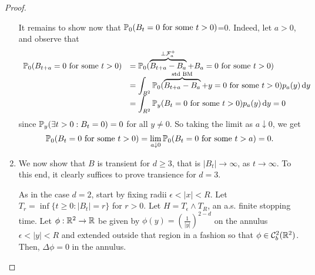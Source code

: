 \documentclass{article}
\begin{document}
\begin{proof}
\begin{enumerate}
 It remains to show now that $ \mathbb{P}_{0}(B_{t}=0 \text{ for some }t>0)$=0. Indeed, let $ a>0$, and observe that 
\[
\begin{array}{ll}
	\mathbb{P}_{0}(B_{t+a}=0 \text{ for some }t>0) &= \mathbb{P}_{0}(\overbrace{B_{t+a}-B_{a}}^{\perp \mathcal{F}^{+}_{a}}+ B_{a}=0 \text{ for some }t> 0) \\
     &= \displaystyle\int_{R^{2}} \mathbb{P}_{0}(\overbrace{B_{t+a}-B_{a}}^{\text{std BM}}+ y =0 \text{ for some }t> 0) p_{a}(y) \operatorname{d}\! y  \\ 
     & = \displaystyle\int_{R^{2}} \mathbb{P}_{y}(B_{t} = 0 \text{ for some }t> 0) p_{a}(y) \operatorname{d}\! y = 0
\end{array}
\]
since $ \mathbb{P}_{y}(\exists t>0: B_{t} = 0)=0$ for all $ y\neq 0$. So taking the limit as $ a\downarrow 0$, we get 
\[
\mathbb{P}_{0}(B_{t}=0 \text{ for some }t>0) = \displaystyle\lim_{a\downarrow 0}\mathbb{P}_{0}(B_{t}=0 \text{ for some }t>a) = 0.
\]
\item We now show that $ B$ is transient for $ d\geq 3$, that is $ |B_{t}|\to \infty$, as $t\to \infty$. To this end, it clearly suffices to prove transience for $ d=3$.\\ 
\parbox[b]{0.55\textwidth}{ 
As in the case $ d=2$, start by fixing radii $ \epsilon<|x|<R$. Let $ T_{r} = \displaystyle\inf\{t\geq 0: |B_{t}|=r\}$ for $ r>0$. Let $ H = T_{\epsilon}\land T_{R}$, an a.s. finite stopping time. Let $ \phi: \mathbb{R}^{2}\to \mathbb{R}$ be given by $ \phi(y) = \left(\frac{1}{|y|}\right)^{2-d}$ on the annulus $ \epsilon<|y|<R$ and extended outside that region in a fashion so that $ \phi\in \mathcal{C}^{2}_{b}(\mathbb{R}^{2})$. Then, $ \Delta\phi = 0$ in the annulus.}
    \hfill  %
    \parbox[b]{0.4\textwidth}{ %
        \centering
        }
\end{enumerate}
\end{proof}
\end{document}
